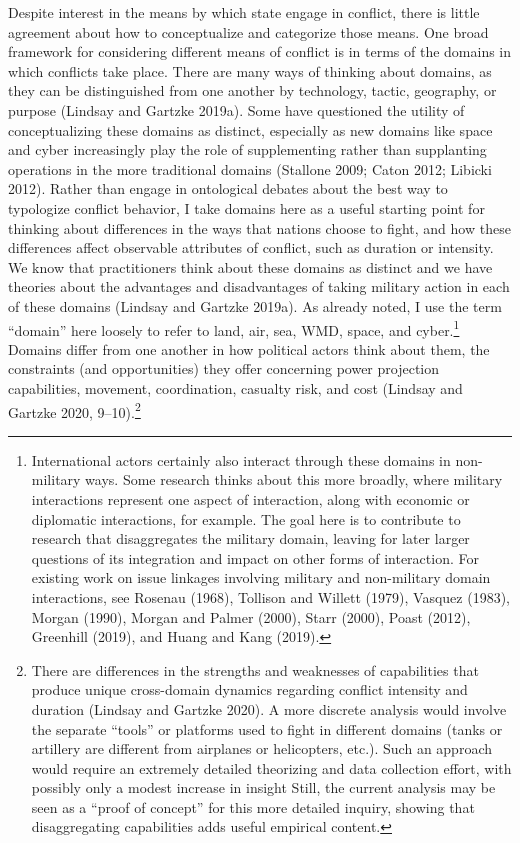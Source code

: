 \documentclass[
]{article}
\begin{document}
Despite interest in the means by which state engage in conflict, there is little agreement about how to conceptualize and categorize those means. One broad framework for considering different means of conflict is in terms of the domains in which conflicts take place. There are many ways of thinking about domains, as they can be distinguished from one another by technology, tactic, geography, or purpose (Lindsay and Gartzke 2019a). Some have questioned the utility of conceptualizing these domains as distinct, especially as new domains like space and cyber increasingly play the role of supplementing rather than supplanting operations in the more traditional domains (Stallone 2009; Caton 2012; Libicki 2012). Rather than engage in ontological debates about the best way to typologize conflict behavior, I take domains here as a useful starting point for thinking about differences in the ways that nations choose to fight, and how these differences affect observable attributes of conflict, such as duration or intensity. We know that practitioners think about these domains as distinct and we have theories about the advantages and disadvantages of taking military action in each of these domains (Lindsay and Gartzke 2019a). As already noted, I use the term ``domain'' here loosely to refer to land, air, sea, WMD, space, and cyber.\footnote{International actors certainly also interact through these domains in non-military ways. Some research thinks about this more broadly, where military interactions represent one aspect of interaction, along with economic or diplomatic interactions, for example. The goal here is to contribute to research that disaggregates the military domain, leaving for later larger questions of its integration and impact on other forms of interaction. For existing work on issue linkages involving military and non-military domain interactions, see Rosenau (1968), Tollison and Willett (1979), Vasquez (1983), Morgan (1990), Morgan and Palmer (2000), Starr (2000), Poast (2012), Greenhill (2019), and Huang and Kang (2019).} Domains differ from one another in how political actors think about them, the constraints (and opportunities) they offer concerning power projection capabilities, movement, coordination, casualty risk, and cost (Lindsay and Gartzke 2020, 9--10).\footnote{There are differences in the strengths and weaknesses of capabilities that produce unique cross-domain dynamics regarding conflict intensity and duration (Lindsay and Gartzke 2020). A more discrete analysis would involve the separate ``tools'' or platforms used to fight in different domains (tanks or artillery are different from airplanes or helicopters, etc.). Such an approach would require an extremely detailed theorizing and data collection effort, with possibly only a modest increase in insight Still, the current analysis may be seen as a ``proof of concept'' for this more detailed inquiry, showing that disaggregating capabilities adds useful empirical content.}
\end{document}
